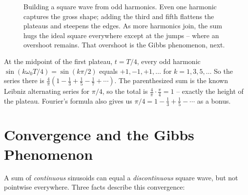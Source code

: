 \begin{figure}[H]
\centering
{}
\caption{Building a square wave from odd harmonics. Even one harmonic captures the gross
shape; adding the third and fifth flattens the plateaus and steepens the edges. As more
harmonics join, the sum hugs the ideal square everywhere except at the jumps -- where an
overshoot remains. That overshoot is the Gibbs phenomenon, next.}
\label{ch06:fig-square}
\end{figure}

\begin{example}
At the midpoint of the first plateau, \(t = T/4\), every odd harmonic
\(\sin(k\omega_0 T/4) = \sin(k\pi/2)\) equals \(+1,-1,+1,\dots\) for \(k=1,3,5,\dots\)
So the series there is \(\frac4\pi(1 - \tfrac13 + \tfrac15 - \tfrac17 + \cdots)\). The
parenthesized sum is the known Leibniz alternating series for \(\pi/4\), so the total is
\(\frac4\pi\cdot\frac\pi4 = 1\) -- exactly the height of the plateau. Fourier's formula
also gives us \(\pi/4 = 1 - \tfrac13 + \tfrac15 - \cdots\) as a bonus.
\end{example}

\section{Convergence and the Gibbs Phenomenon}

A sum of \emph{continuous} sinusoids can equal a \emph{discontinuous} square wave, but not pointwise everywhere. Three facts describe this convergence:


